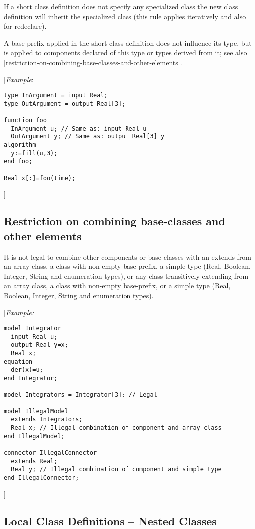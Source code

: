 If a short class definition does not specify any specialized class the
new class definition will inherit the specialized class (this rule
applies iteratively and also for redeclare).

A base-prefix applied in the short-class definition does not influence
its type, but is applied to components declared of this type or types
derived from it; see also \autoref{restriction-on-combining-base-classes-and-other-elements}.

{[}\emph{Example}:
\begin{lstlisting}[language=modelica]
type InArgument = input Real;
type OutArgument = output Real[3];

function foo
  InArgument u; // Same as: input Real u
  OutArgument y; // Same as: output Real[3] y
algorithm
  y:=fill(u,3);
end foo;

Real x[:]=foo(time);
\end{lstlisting}

{]}

\subsection{Restriction on combining base-classes and other elements}

It is not legal to combine other components or base-classes with an
extends from an array class, a class with non-empty base-prefix, a
simple type (Real, Boolean, Integer, String and enumeration types), or
any class transitively extending from an array class, a class with
non-empty base-prefix, or a simple type (Real, Boolean, Integer, String
and enumeration types).

{[}\emph{Example:}
\begin{lstlisting}[language=modelica]
model Integrator
  input Real u;
  output Real y=x;
  Real x;
equation
  der(x)=u;
end Integrator;

model Integrators = Integrator[3]; // Legal

model IllegalModel
  extends Integrators;
  Real x; // Illegal combination of component and array class 
end IllegalModel;

connector IllegalConnector
  extends Real;
  Real y; // Illegal combination of component and simple type
end IllegalConnector;
\end{lstlisting}

{]}

\subsection{Local Class Definitions -- Nested Classes}

